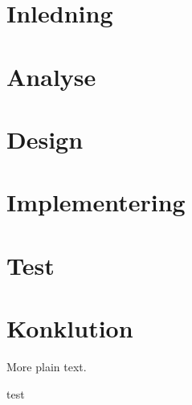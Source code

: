 \documentclass[11pt,a4paper]{report}  	%
\begin{document}
\nocite{*}					%


\tableofcontents

\chapter{Inledning}


\chapter{Analyse}


\chapter{Design}


\chapter{Implementering}


\chapter{Test}


\chapter{Konklution}





More plain text.\cite{pear}	%

test\cite{wikipedia}

\end{document}
